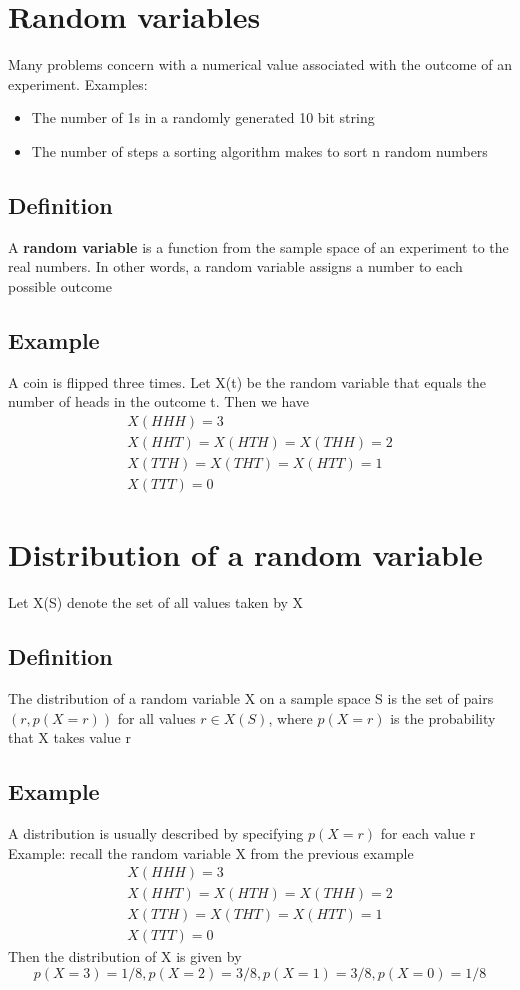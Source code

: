 \documentclass{article}[18pt]
\begin{document}
\section{Random variables}
Many problems concern with a numerical value associated with the outcome of an experiment. Examples:
\begin{itemize}
	\item The number of 1s in a randomly generated 10 bit string
	\item The number of steps a sorting algorithm makes to sort n random numbers
\end{itemize}
\subsection{Definition}
A \textbf{random variable} is a function from the sample space of an experiment to the real numbers. In other words, a random variable assigns a number to each possible outcome
\subsection{Example}
A coin is flipped three times. Let X(t) be the random variable that
equals the number of heads in the outcome t. Then we have\\
$$\begin{array} { l } { X ( H H H ) = 3 } \\ { X ( H H T ) = X ( H T H ) = X ( T H H ) = 2 } \\ { X ( T T H ) = X ( T H T ) = X ( H T T ) = 1 } \\ { X ( T T T ) = 0 } \end{array}$$
\section{Distribution of a random variable}
Let X(S) denote the set of all values taken by X
\subsection{Definition}
The distribution of a random variable X on a sample space S is the set of pairs $(r,p(X=r))$ for all values $r\in X(S)$, where $p(X=r)$ is the probability that X takes value r
\subsection{Example}
A distribution is usually described by specifying $p(X=r)$ for each value r\\
Example: recall the random variable X from the previous example
$$\begin{array} { l } { X ( H H H ) = 3 } \\ { X ( H H T ) = X ( H T H ) = X ( T H H ) = 2 } \\ { X ( T T H ) = X ( T H T ) = X ( H T T ) = 1 } \\ { X ( T T T ) = 0 } \end{array}$$
Then the distribution of X is given by
$$p ( X = 3 ) = 1 / 8 , p ( X = 2 ) = 3 / 8 , p ( X = 1 ) = 3 / 8 , p ( X = 0 ) = 1 / 8$$
\end{document}
